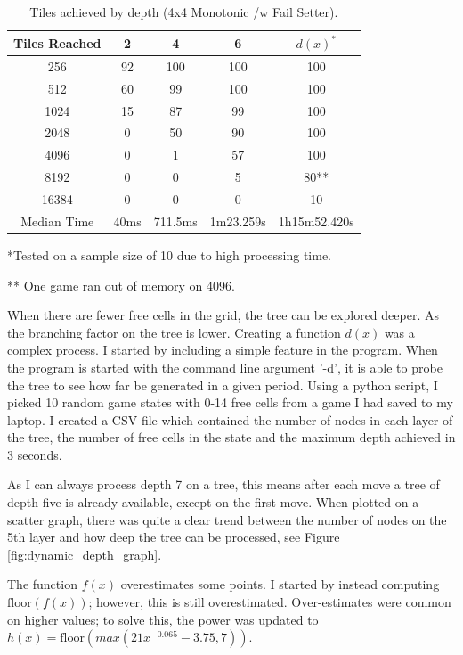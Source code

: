 \documentclass{article}
\begin{document}
\begin{table}
    \centering
    \begin{tabular}{|c| c c c | c |}
\hline
Tiles Reached&2&4&6&$d(x)^*$\\
\hline
256&92&100&100&100\\
512&60&99&100&100\\
1024&15&87&99&100\\
2048&0&50&90&100\\
4096&0&1&57&100\\
8192&0&0&5&80\textsc{**}\\
16384&0&0&0&10\\
\hline
Median Time & 40ms & 711.5ms & 1m23.259s & 1h15m52.420s\\
\hline
    \end{tabular}
    \caption{Tiles achieved by depth (4x4 Monotonic /w Fail Setter).  }
    \label{tab:depth}
    \par{\textsc{*}Tested on a sample size of 10 due to high processing time.}
    \par{\textsc{**} One game ran out of memory on 4096.}
\end{table}

When there are fewer free cells in the grid, the tree can be explored deeper. As the branching factor on the tree is lower. Creating a function $d(x)$ was a complex process. I started by including a simple feature in the program. When the program is started with the command line argument '-d', it is able to probe the tree to see how far be generated in a given period. Using a python script, I picked 10 random game states with 0-14 free cells from a game I had saved to my laptop. I created a CSV file which contained the number of nodes in each layer of the tree, the number of free cells in the state and the maximum depth achieved in 3 seconds.

As I can always process depth 7 on a tree, this means after each move a tree of depth five is already available, except on the first move. When plotted on a scatter graph, there was quite a clear trend between the number of nodes on the 5th layer and how deep the tree can be processed, see Figure \ref{fig:dynamic_depth_graph}.


The function $f(x)$ overestimates some points. I started by instead computing $\text{floor}(f(x))$; however, this is still overestimated. Over-estimates were common on higher values; to solve this, the power was updated to $h(x) = \text{floor}(max(21 x^{-0.065} - 3.75, 7))$. 
\end{document}
